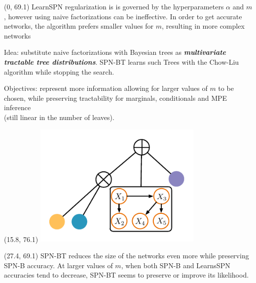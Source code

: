 \documentclass[final]{beamer}
\begin{document}
\begin{frame}{}
  \begin{textblock}{25.2}(0, 69.1)
    \footnotesize
    LearnSPN regularization is is governed by the hyperparameters $\alpha$ and $m$,
    however using naive factorizations can be ineffective. In order to
    get accurate networks, the algorithm prefers smaller values for
    $m$, resulting in more complex networks\par\bigskip

    Idea: substitute naive factorizations with Bayesian trees as
    \emph{\textbf{multivariate tractable tree
        distributions}}. \textsf{SPN-BT} learns such \textsf{T}rees
    with the Chow-Liu algorithm while stopping the search.\par\bigskip

    \begin{minipage}[t]{0.6\linewidth}
        \flushleft
        Objectives: represent more information allowing for larger
        values of $m$ to be chosen, while preserving tractability for marginals,
        conditionals and MPE inference\\(still linear in the number of leaves).
      \end{minipage}%
  \end{textblock}

  \begin{textblock}{10}(15.8, 76.1)
    \includegraphics[width=8.2cm]{figures/spn-clt}
    \end{textblock}
  
  \begin{textblock}{25.2}(27.4, 69.1)
    \footnotesize
    \textsf{SPN-BT} reduces the
    size of the networks even more while preserving \textsf{SPN-B}
    accuracy. At larger values of $m$, when both SPN-B and LearnsSPN
    accuracies tend to decrease, \textsf{SPN-BT} seems to preserve or
    improve its likelihood.
    

\end{textblock}
\end{frame}
\end{document}

